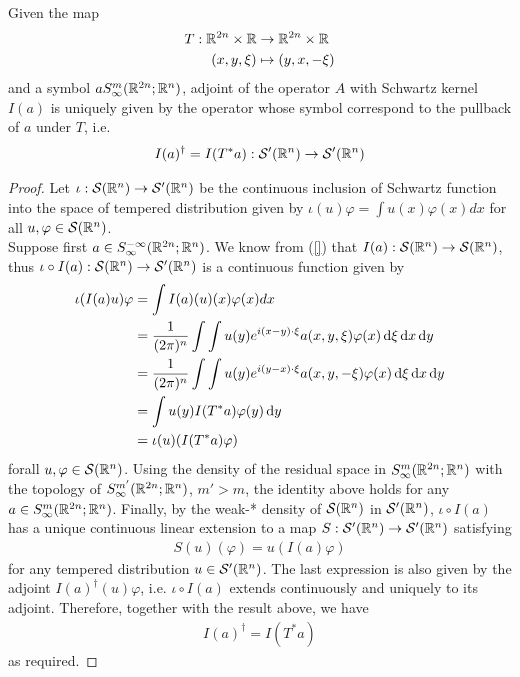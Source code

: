 \documentclass[12pt]{article}
\begin{document}
\begin{flemma}  \label{lemma : frechet adjoint of pseudo}
    Given the map
    \begin{align*}
    T: \R^{2n} \times \R &\to \R^{2n} \times \R \\
    (x, y, \xi) &\mapsto (y, x, -\xi)
    \end{align*}
    and a symbol $a S^{m}_{\infty}(\R^{2n}; \R^{n})$, adjoint of the operator $A$ with Schwartz kernel $I(a)$ is uniquely given by the operator whose symbol correspond to the pullback of $a$ under $T$, i.e. 
    \begin{align*}
    I(a)^\dagger = I(T^*a) : \sch'(\R^n) \to \sch'(\R^n)
    \end{align*}    
\end{flemma}
\begin{proof}
    Let $\iota : \sch(\R^n) \to \sch'(\R^n)$ be the continuous inclusion of Schwartz function into the space of tempered distribution given by $\iota(u) \varphi = \int u(x) \varphi(x) dx$ for all $u, \varphi \in \sch(\R^n)$. \\
    
    Suppose first $a \in S^{-\infty}_{\infty}(\R^{2n}; \R^{n})$. We know from (\ref{}) that $I(a) : \sch(\R^n) \to \sch(\R^n)$, thus $\iota \circ I(a) : \sch(\R^n) \to \sch'(\R^n)$ is a continuous function given by \begin{align*}
    \iota(I(a)u) \varphi
    & = \int I(a)(u)(x) \varphi(x) dx \\
    & = \frac{1}{(2\pi)^n}  \int\int u(y) e^{i (x - y) \cdot \xi} a(x, y, \xi) \varphi(x) \d[\xi] \d[x] \d[y] \\
    & =  \frac{1}{(2\pi)^n} \int \int u(y) e^{i (y - x) \cdot \xi} a(x, y, - \xi) \varphi(x) \d[\xi] \d[x] \d[y] \\
    &= \int u(y) I(T^*a) \varphi(y) \d[y]\\
    & = \iota(u)(I(T^*a)\varphi)
    \end{align*}
    forall $u, \varphi \in \sch(\R^n)$. Using the density of the residual space in $S^{m}_{\infty}(\R^{2n}; \R^{n})$ with the topology of $S^{m'}_{\infty}(\R^{2n}; \R^{n})$, $m' > m$, the identity above holds for any $a \in S^{m}_{\infty}(\R^{2n}; \R^{n})$. Finally, by the weak-* density of $\sch(\R^n)$ in $\sch'(\R^n)$, $\iota \circ I(a)$ has a unique continuous linear extension to a map $S: \sch'(\R^n) \to \sch'(\R^n)$ satisfying
    \begin{align*}
    S(u)(\varphi) = u(I(a)\varphi) 
    \end{align*}
    for any tempered distribution $u \in \sch'(\R^n)$. The last expression is also given by the adjoint $I(a)^\dagger (u) \varphi$, i.e. $\iota \circ I(a)$ extends continuously and uniquely to its adjoint. Therefore, together with the result above, we have 
    \begin{align*}
    I(a)^\dagger = I(T^* a)
    \end{align*}
    as required. 
\end{proof}
\end{document}
